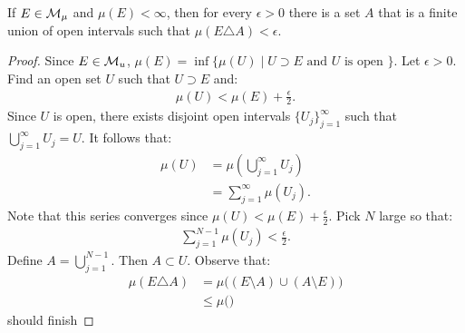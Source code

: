     \begin{proposition}\label{prop:approximate-leb-stielt-meas-sets-with-finite-union-of-open-ints}
        If $E \in \mathcal{M}_\mu$ and $\mu(E) < \infty$, then for every $\epsilon > 0$ there is a set $A$ that is a finite union of open intervals such that $\mu(E \triangle A) < \epsilon$.
    \end{proposition}
        \begin{proof}
            Since $E \in \mathcal{M}_u$, $\mu(E) = \inf\{\mu(U) \mid U \supset E \text{ and } U \text{ is open }\}$. Let $\epsilon > 0$. Find an open set $U$ such that $U \supset E$ and:
                \begin{equation*}
                \begin{split}
                    \mu(U) < \mu(E) + \frac{\epsilon}{2}.
                \end{split}
                \end{equation*}
            Since $U$ is open, there exists disjoint open intervals $\{U_j\}_{j = 1}^\infty$ such that $\bigcup_{j = 1}^\infty U_j = U$. It follows that:
                \begin{equation*}
                \begin{split}
                    \mu(U) 
                    & = \mu \left( \bigcup_{j = 1}^\infty U_j \right) \\
                    & = \sum_{j = 1}^\infty \mu(U_j).
                \end{split}
                \end{equation*}
            Note that this series converges since $\mu(U) < \mu(E) + \frac{\epsilon}{2}$. Pick $N$ large so that:
                \begin{equation*}
                \begin{split}
                    \sum_{j = 1}^{N-1}\mu(U_j) < \frac{\epsilon}{2}.
                \end{split}
                \end{equation*}
            Define $A = \bigcup_{j = 1}^{N-1}$. Then $A \subset U$. Observe that:
                \begin{equation*}
                \begin{split}
                    \mu(E \triangle A)
                    & = \mu\bigl((E \setminus A) \cup (A \setminus E)\bigr) \\
                    & \leq \mu \bigl(\bigr)
                \end{split}
                \end{equation*}
            {\color{red} should finish} 
        \end{proof}

